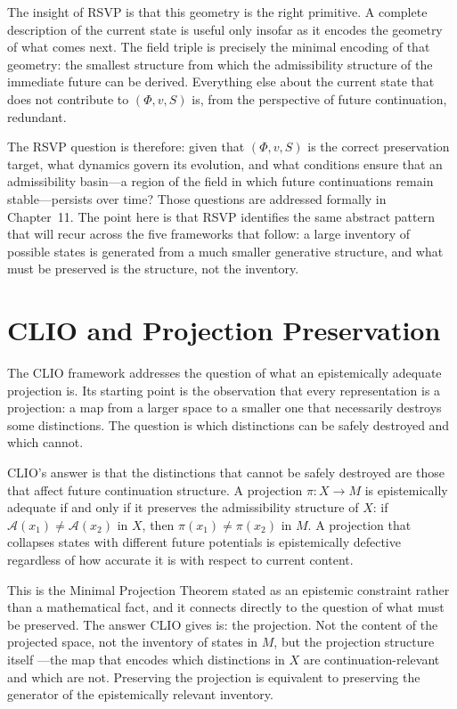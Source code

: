 \documentclass[12pt, oneside]{book}
\theoremstyle{flyxion}
\theoremstyle{definition}
\begin{document}
The insight of RSVP is that this geometry is the right primitive.
A complete description of the current state is useful only insofar
as it encodes the geometry of what comes next. The field triple is
precisely the minimal encoding of that geometry: the smallest
structure from which the admissibility structure of the immediate
future can be derived. Everything else about the current state that
does not contribute to $(\Phi, v, S)$ is, from the perspective of
future continuation, redundant.

The RSVP question is therefore: given that $(\Phi, v, S)$ is the
correct preservation target, what dynamics govern its evolution,
and what conditions ensure that an admissibility basin---a region
of the field in which future continuations remain stable---persists
over time? Those questions are addressed formally in Chapter~11.
The point here is that RSVP identifies the same abstract pattern
that will recur across the five frameworks that follow: a large
inventory of possible states is generated from a much smaller
generative structure, and what must be preserved is the structure,
not the inventory.

\section{CLIO and Projection Preservation}

The CLIO framework addresses the question of what an epistemically
adequate projection is. Its starting point is the observation that
every representation is a projection: a map from a larger space to
a smaller one that necessarily destroys some distinctions. The
question is which distinctions can be safely destroyed and which
cannot.

CLIO's answer is that the distinctions that cannot be safely destroyed
are those that affect future continuation structure. A projection
$\pi : X \to M$ is epistemically adequate if and only if it preserves
the admissibility structure of $X$: if $\mathcal{A}(x_1) \neq
\mathcal{A}(x_2)$ in $X$, then $\pi(x_1) \neq \pi(x_2)$ in $M$.
A projection that collapses states with different future potentials
is epistemically defective regardless of how accurate it is with
respect to current content.

This is the Minimal Projection Theorem stated as an epistemic
constraint rather than a mathematical fact, and it connects directly
to the question of what must be preserved. The answer CLIO gives
is: the projection. Not the content of the projected space, not
the inventory of states in $M$, but the projection structure itself
---the map that encodes which distinctions in $X$ are
continuation-relevant and which are not. Preserving the projection
is equivalent to preserving the generator of the epistemically
relevant inventory.
\end{document}
